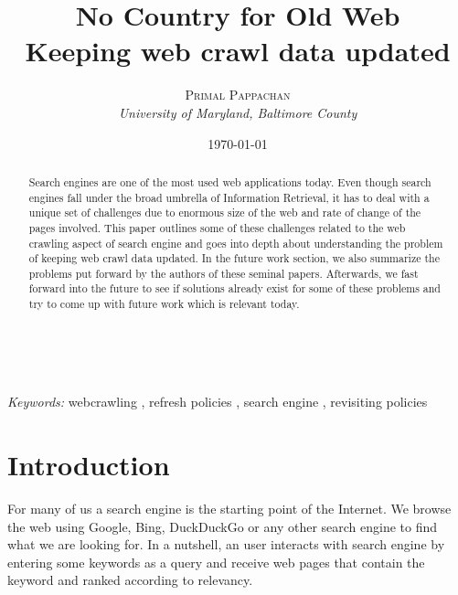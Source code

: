\documentclass[a4paper, 11pt]{article} %
\title{\textbf{No Country for Old Web}\\ %
Keeping web crawl data updated} %
\author{\textsc{Primal Pappachan} %
\\{\textit{University of Maryland, Baltimore County}}} %
\date{\today} %
\makeatletter
\renewcommand{\maketitle}{ %
\begin{flushright} %
{\LARGE\@title} %

\vspace{50pt} %

{\large\@author} %
\\\@date %

\vspace{40pt} %
\end{flushright}
}
\makeatother
\begin{document}
\maketitle %



\begin{abstract}

Search engines are one of the most used web applications today. Even though search engines fall under the broad umbrella of Information Retrieval, it has to deal with a unique set of challenges due to enormous size of the web and rate of change of the pages involved. This paper outlines some of these challenges related to the web crawling aspect of search engine and goes into depth about understanding the problem of keeping web crawl data updated. In the future work section, we also summarize the problems put forward by the authors of these seminal papers. Afterwards, we fast forward into the future to see if solutions already exist for some of these problems and try to come up with future work which is relevant today.   

\end{abstract}

\hspace*{3,6mm}\textit{Keywords:} webcrawling , refresh policies , search engine , revisiting policies %

\vspace{30pt} %


\section*{Introduction}

For many of us a search engine is the starting point of the Internet. We browse the web using Google, Bing, DuckDuckGo or any other search engine to find what we are looking for. In a nutshell, an user interacts with search engine by entering some keywords as a query and receive web pages that contain the keyword and ranked according to relevancy. \\
\end{document}
